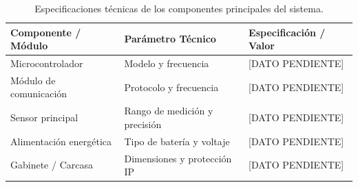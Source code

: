 \begin{table}[htbp]
    \centering
    \caption{Especificaciones técnicas de los componentes principales del sistema.}
    \label{tab:especificaciones_tecnicas}
    \begin{tabular}{lll}
        \toprule
        \textbf{Componente / Módulo} & \textbf{Parámetro Técnico} & \textbf{Especificación / Valor} \\
        \midrule
        Microcontrolador & Modelo y frecuencia & [DATO PENDIENTE] \\
        Módulo de comunicación & Protocolo y frecuencia & [DATO PENDIENTE] \\
        Sensor principal & Rango de medición y precisión & [DATO PENDIENTE] \\
        Alimentación energética & Tipo de batería y voltaje & [DATO PENDIENTE] \\
        Gabinete / Carcasa & Dimensiones y protección IP & [DATO PENDIENTE] \\
        \bottomrule
    \end{tabular}
\end{table}
